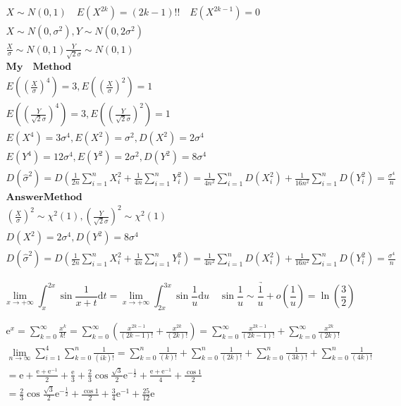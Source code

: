 \documentclass{article}
\begin{document}
\begin{align*}
    X \sim N(0,1) \quad E(X^{2k}) = (2k-1)!! \quad E(X^{2k-1}) = 0 \\ 
    X \sim N(0,\sigma^2),Y \sim N(0,2\sigma^2) \\ 
    \frac{X}{\sigma} \sim N(0,1) \frac{Y}{\sqrt{2}\sigma} \sim N(0,1) \\ 
    \bm{My \quad Method} \\ 
    E(\left(\frac{X}{\sigma}\right)^4) = 3 , E(\left(\frac{X}{\sigma}\right)^2) = 1 \\ 
    E(\left(\frac{Y}{\sqrt{2}\sigma}\right)^4) = 3 , E(\left(\frac{Y}{\sqrt{2}\sigma}\right)^2) = 1 \\ 
    E(X^4) = 3\sigma^4 , E(X^2) = \sigma^2 , D(X^2) = 2\sigma^4 \\
    E(Y^4) = 12\sigma^4 , E(Y^2) = 2\sigma^2 , D(Y^2) = 8\sigma^4 \\
    D(\hat{\sigma}^2) = D(\frac{1}{2n}\sum_{i=1}^nX_{i}^2+\frac{1}{4n}\sum_{i=1}^nY_{i}^2) = \frac{1}{4n^2}\sum_{i=1}^{n}D(X_{i}^2)+\frac{1}{16n^2}\sum_{i=1}^{n}D(Y_{i}^2) = \frac{\sigma^4}{n}
    \\
    \bm{Answer Method}  \\ 
    (\frac{X}{\sigma})^2 \sim \chi^2{(1)} , (\frac{Y}{\sqrt{2}\sigma})^2 \sim \chi^2{(1)}\\  
    D(X^2) = 2\sigma^4  , D(Y^2) = 8\sigma^4 \\ 
    D(\hat{\sigma}^2) = D(\frac{1}{2n}\sum_{i=1}^nX_{i}^2+\frac{1}{4n}\sum_{i=1}^nY_{i}^2) = \frac{1}{4n^2}\sum_{i=1}^{n}D(X_{i}^2)+\frac{1}{16n^2}\sum_{i=1}^{n}D(Y_{i}^2) = \frac{\sigma^4}{n}  
\end{align*}

\begin{displaymath}
    \lim_{x \to +\infty} \int_{x}^{2x} \sin\frac{1}{x+t}\mathrm{d}t = \lim_{x \to +\infty}\int_{2x}^{3x}\sin\frac{1}{u} \mathrm{d}u \quad \underrightarrow{\sin\frac{1}{u} \sim \frac{1}{u}+o(\frac{1}{u})} = \ln(\frac{3}{2}) 
\end{displaymath}

\begin{align*}
    \mathrm{e}^{x} = \sum_{k=0}^{\infty} \frac{x^{k}}{k!} = \sum_{k=0}^{\infty}\left(\frac{x^{2k-1}}{(2k-1)!}+\frac{x^{2k}}{(2k)!}\right) = \sum_{k=0}^{\infty}\frac{x^{2k-1}}{(2k-1)!}+\sum_{k=0}^{\infty}\frac{x^{2k}}{(2k)!} \\ 
    \lim_{n \to \infty} \sum_{i=1}^{4}\sum_{k=0}^{n} \frac{1}{(ik)!} = \sum_{k=0}^{n} \frac{1}{(k)!} + \sum_{k=0}^{n} \frac{1}{(2k)!} + \sum_{k=0}^{n} \frac{1}{(3k)!} + \sum_{k=0}^{n} \frac{1}{(4k)!} \\ 
    = \mathrm{e}+\frac{\mathrm{e}+\mathrm{e}^{-1}}{2}+\frac{\mathrm{e}}{3}+\frac{2}{3}\cos{\frac{\sqrt{3}}{2}}\mathrm{e}^{-\frac{1}{2}} + \frac{\mathrm{e}+\mathrm{e}^{-1}}{4}+\frac{\cos 1}{2} \\ 
    = \frac{2}{3}\cos{\frac{\sqrt{3}}{2}}\mathrm{e}^{-\frac{1}{2}} + \frac{\cos 1}{2} + \frac{3}{4}\mathrm{e}^{-1}+\frac{25}{12}\mathrm{e} 
\end{align*}
\end{document}
